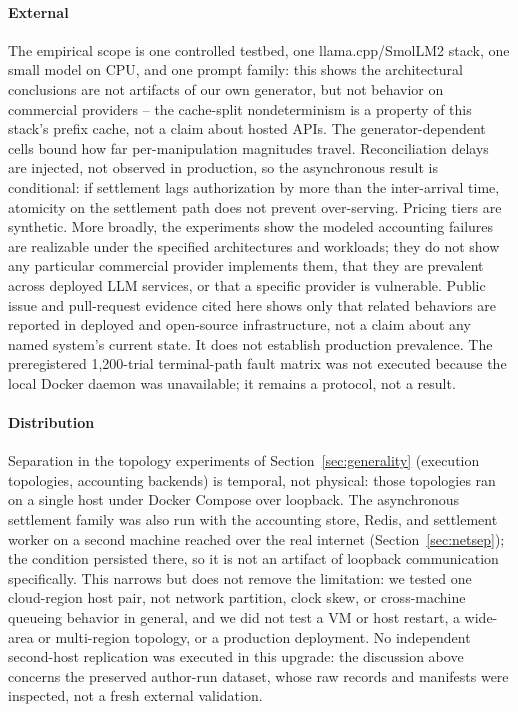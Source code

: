 \documentclass[manuscript,review]{acmart}
\begin{document}
\paragraph{External}
The empirical scope is one controlled testbed, one llama.cpp/SmolLM2 stack, one small
model on CPU, and one prompt family: this shows the
architectural conclusions are not artifacts of our own generator, but not behavior on
commercial providers -- the cache-split nondeterminism is a property of this stack's
prefix cache, not a claim about hosted APIs. The generator-dependent cells bound how far
per-manipulation magnitudes travel. Reconciliation delays are injected, not observed in
production, so the asynchronous result is conditional: if settlement lags authorization by
more than the inter-arrival time, atomicity on the settlement path does not prevent
over-serving. Pricing tiers are synthetic. More broadly, the experiments show the modeled
accounting failures are realizable under the specified architectures and workloads; they
do not show any particular commercial provider implements them, that they are prevalent
across deployed LLM services, or that a specific provider is vulnerable. Public issue and
pull-request evidence cited here shows only that related behaviors are reported in
deployed and open-source infrastructure, not a claim about any named system's current
state. It does not establish production prevalence. The preregistered 1,200-trial
terminal-path fault matrix was not executed because the local Docker daemon was
unavailable; it remains a protocol, not a result.

\paragraph{Distribution}
Separation in the topology experiments of Section~\ref{sec:generality} (execution
topologies, accounting backends) is temporal, not physical: those topologies ran on a
single host under Docker Compose over loopback. The asynchronous settlement family was
also run with the accounting store, Redis, and settlement worker on a second machine
reached over the real internet (Section~\ref{sec:netsep}); the condition persisted there,
so it is not an artifact of loopback communication specifically. This narrows but does
not remove the limitation: we tested one cloud-region
host pair, not network partition, clock skew, or cross-machine queueing behavior in
general, and we did not test a VM or host restart, a wide-area or multi-region topology,
or a production deployment. No independent second-host replication was executed in this
upgrade: the discussion above concerns the preserved author-run dataset, whose raw records
and manifests were inspected, not a fresh external validation.
\end{document}
